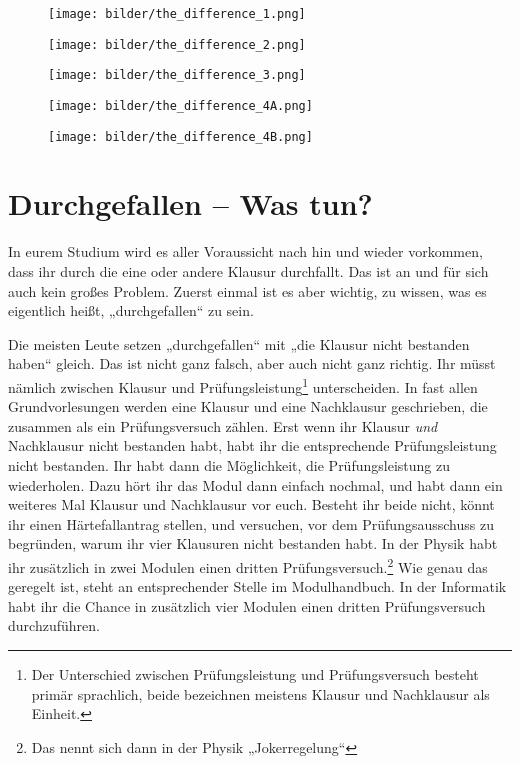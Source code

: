 
\begin{figure*}[t]
    \centering
    \begin{subfigure}[b]{.18\textwidth}
    \texttt{[image: bilder/the\_difference\_1.png]}	    
    \end{subfigure}
    \begin{subfigure}[b]{.18\textwidth}
    \texttt{[image: bilder/the\_difference\_2.png]}
    \end{subfigure}
    \begin{subfigure}[b]{.18\textwidth}
    \texttt{[image: bilder/the\_difference\_3.png]}
    \end{subfigure}
    \begin{subfigure}[b]{.18\textwidth}
    \texttt{[image: bilder/the\_difference\_4A.png]}
    \end{subfigure}
    \begin{subfigure}[b]{.18\textwidth}
    \texttt{[image: bilder/the\_difference\_4B.png]}
    \end{subfigure}
\end{figure*}

\section{Durchgefallen -- Was tun?}

In eurem Studium wird es aller Voraussicht nach hin und wieder vorkommen, dass ihr durch die eine oder andere Klausur durchfallt. Das ist an und für sich auch kein großes Problem. Zuerst einmal ist es aber wichtig, zu wissen, was es eigentlich heißt, „durchgefallen“ zu sein.

Die meisten Leute setzen „durchgefallen“ mit „die Klausur nicht bestanden haben“ gleich. Das ist nicht ganz falsch, aber auch nicht ganz richtig. Ihr müsst nämlich zwischen Klausur und Prüfungsleistung\footnote{ Der Unterschied zwischen Prüfungsleistung und Prüfungsversuch besteht primär sprachlich, beide bezeichnen meistens Klausur und Nachklausur als Einheit.} unterscheiden. In fast allen Grundvorlesungen werden eine Klausur und eine Nachklausur geschrieben, die zusammen als ein Prüfungsversuch zählen. Erst wenn ihr Klausur \emph{und} Nachklausur nicht bestanden habt, habt ihr die entsprechende Prüfungsleistung nicht bestanden. Ihr habt dann die Möglichkeit, die Prüfungsleistung zu wiederholen. Dazu hört ihr das Modul dann einfach nochmal, und habt dann ein weiteres Mal Klausur und Nachklausur vor euch. Besteht ihr beide nicht, könnt ihr einen Härtefallantrag stellen, und versuchen, vor dem Prüfungsausschuss zu begründen, warum ihr vier Klausuren nicht bestanden habt. In der Physik habt ihr zusätzlich in zwei Modulen einen dritten Prüfungsversuch.\footnote{Das nennt sich dann in der Physik „Jokerregelung“} Wie genau das geregelt ist, steht an entsprechender Stelle im Modulhandbuch. In der Informatik habt ihr die Chance in zusätzlich vier Modulen einen dritten Prüfungsversuch durchzuführen.

